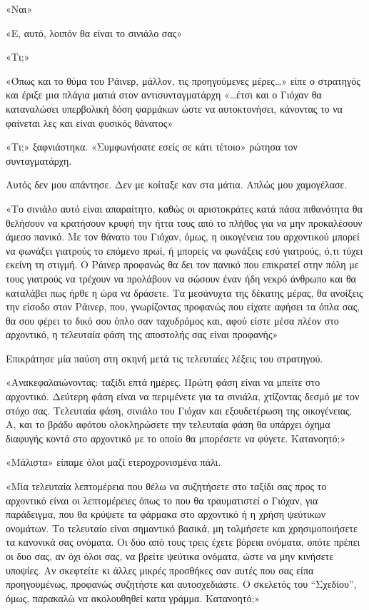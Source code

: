 \documentclass[12pt,twoside, openany]{book}
\begin{document}
«Ναι»

«Ε, αυτό, λοιπόν θα είναι το σινιάλο σας»

«Τι;»

«Όπως και το θύμα του Ράινερ, μάλλον, τις προηγούμενες μέρες…» είπε ο στρατηγός και έριξε μια πλάγια ματιά στον αντισυνταγματάρχη «…έτσι και ο Γιόχαν θα καταναλώσει υπερβολική δόση φαρμάκων ώστε να αυτοκτονήσει, κάνοντας το να φαίνεται λες και είναι φυσικός θάνατος»

«Τι;» ξαφνιάστηκα. «Συμφωνήσατε εσείς σε κάτι τέτοιο» ρώτησα τον συνταγματάρχη.

Αυτός δεν μου απάντησε. Δεν με κοίταξε καν στα μάτια. Απλώς μου χαμογέλασε.

«Το σινιάλο αυτό είναι απαραίτητο, καθώς οι αριστοκράτες κατά πάσα πιθανότητα θα θελήσουν να κρατήσουν κρυφή την ήττα τους από το πλήθος για να μην προκαλέσουν άμεσο πανικό. Με τον θάνατο του Γιόχαν, όμως, η οικογένεια του αρχοντικού μπορεί να φωνάξει γιατρούς το επόμενο πρωί, ή μπορείς να φωνάξεις εσύ γιατρούς, ό,τι τύχει εκείνη τη στιγμή. Ο Ράινερ προφανώς θα δει τον πανικό που επικρατεί στην πόλη με τους γιατρούς να τρέχουν να προλάβουν να σώσουν έναν ήδη νεκρό άνθρωπο και θα καταλάβει πως ήρθε η ώρα να δράσετε. Τα μεσάνυχτα της δέκατης μέρας, θα ανοίξεις την είσοδο στον Ράινερ, που, γνωρίζοντας προφανώς που είχατε αφήσει τα όπλα σας, θα σου φέρει το δικό σου όπλο σαν ταχυδρόμος και, αφού είστε μέσα πλέον στο αρχοντικό, η τελευταία φάση της αποστολής σας είναι προφανής»

Επικράτησε μία παύση στη σκηνή μετά τις τελευταίες λέξεις του στρατηγού.

«Ανακεφαλαιώνοντας: ταξίδι επτά ημέρες. Πρώτη φάση είναι να μπείτε στο αρχοντικό. Δεύτερη φάση είναι να περιμένετε για τα σινιάλα, χτίζοντας δεσμό με τον στόχο σας. Τελευταία φάση, σινιάλο του Γιόχαν και εξουδετέρωση της οικογένειας. Α, και το βράδυ αφότου ολοκληρώσετε την τελευταία φάση θα υπάρχει όχημα διαφυγής κοντά στο αρχοντικό με το οποίο θα μπορέσετε να φύγετε. Κατανοητό;»

«Μάλιστα» είπαμε όλοι μαζί ετεροχρονισμένα πάλι.

«Μία τελευταία λεπτομέρεια που θέλω να συζητήσετε στο ταξίδι σας προς το αρχοντικό είναι οι λεπτομέρειες όπως το που θα τραυματιστεί ο Γιόχαν, για παράδειγμα, που θα κρύψετε τα φάρμακα στο αρχοντικό ή η χρήση ψεύτικων ονομάτων. Το τελευταίο είναι σημαντικό βασικά, μη τολμήσετε και χρησιμοποιήσετε τα κανονικά σας ονόματα. Οι δύο από τους τρεις έχετε βόρεια ονόματα, οπότε πρέπει οι δυο σας, αν όχι όλοι σας, να βρείτε ψεύτικα ονόματα, ώστε να μην κινήσετε υποψίες. Αν σκεφτείτε κι άλλες μικρές προσθήκες σαν αυτές που σας είπα προηγουμένως, προφανώς συζητήστε και αυτοσχεδιάστε. Ο σκελετός του “Σχεδίου”, όμως, παρακαλώ να ακολουθηθεί κατα γράμμα. Κατανοητό;»
\end{document}
